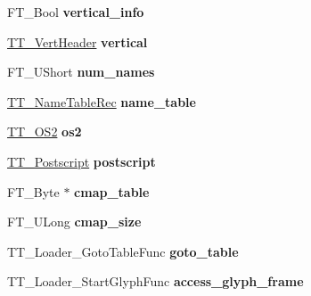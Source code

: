 \begin{DoxyCompactItemize}
\item 
\hypertarget{struct_t_t___face_rec___a43e1c7d3fd3f43ddd7b1bba243bf10bc}{
FT\_\-Bool {\bfseries vertical\_\-info}}
\label{struct_t_t___face_rec___a43e1c7d3fd3f43ddd7b1bba243bf10bc}

\item 
\hypertarget{struct_t_t___face_rec___a04fc41d3860163177a7e0a9bcf71ccf4}{
\hyperlink{struct_t_t___vert_header__}{TT\_\-VertHeader} {\bfseries vertical}}
\label{struct_t_t___face_rec___a04fc41d3860163177a7e0a9bcf71ccf4}

\item 
\hypertarget{struct_t_t___face_rec___ae73033d211e0ac91396e6bb22d594fab}{
FT\_\-UShort {\bfseries num\_\-names}}
\label{struct_t_t___face_rec___ae73033d211e0ac91396e6bb22d594fab}

\item 
\hypertarget{struct_t_t___face_rec___a33d114b43e6646893f15d39065b77e8c}{
\hyperlink{struct_t_t___name_table_rec__}{TT\_\-NameTableRec} {\bfseries name\_\-table}}
\label{struct_t_t___face_rec___a33d114b43e6646893f15d39065b77e8c}

\item 
\hypertarget{struct_t_t___face_rec___a5371adcbd62ade9b74e5f24a03ef09f2}{
\hyperlink{struct_t_t___o_s2__}{TT\_\-OS2} {\bfseries os2}}
\label{struct_t_t___face_rec___a5371adcbd62ade9b74e5f24a03ef09f2}

\item 
\hypertarget{struct_t_t___face_rec___a598bb9ada92970931585dc51878cf2cd}{
\hyperlink{struct_t_t___postscript__}{TT\_\-Postscript} {\bfseries postscript}}
\label{struct_t_t___face_rec___a598bb9ada92970931585dc51878cf2cd}

\item 
\hypertarget{struct_t_t___face_rec___a07bfd99f7725a1fb5f27b44a126a46ba}{
FT\_\-Byte $\ast$ {\bfseries cmap\_\-table}}
\label{struct_t_t___face_rec___a07bfd99f7725a1fb5f27b44a126a46ba}

\item 
\hypertarget{struct_t_t___face_rec___a4d2e127541e4f223c0b6c5d5aca4c8c5}{
FT\_\-ULong {\bfseries cmap\_\-size}}
\label{struct_t_t___face_rec___a4d2e127541e4f223c0b6c5d5aca4c8c5}

\item 
\hypertarget{struct_t_t___face_rec___a3e2e3599abb7737179dbb2fbbd15355d}{
TT\_\-Loader\_\-GotoTableFunc {\bfseries goto\_\-table}}
\label{struct_t_t___face_rec___a3e2e3599abb7737179dbb2fbbd15355d}

\item 
\hypertarget{struct_t_t___face_rec___a67cce5f4da277e6c8a47d8efe95bc58c}{
TT\_\-Loader\_\-StartGlyphFunc {\bfseries access\_\-glyph\_\-frame}}
\label{struct_t_t___face_rec___a67cce5f4da277e6c8a47d8efe95bc58c}


\end{DoxyCompactItemize}

